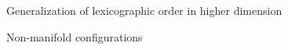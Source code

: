 \begin{frame}
	Generalization of lexicographic order in higher dimension	
\end{frame}

\begin{frame}
	Non-manifold configurations
\end{frame}

\begin{frame}
	
\end{frame}